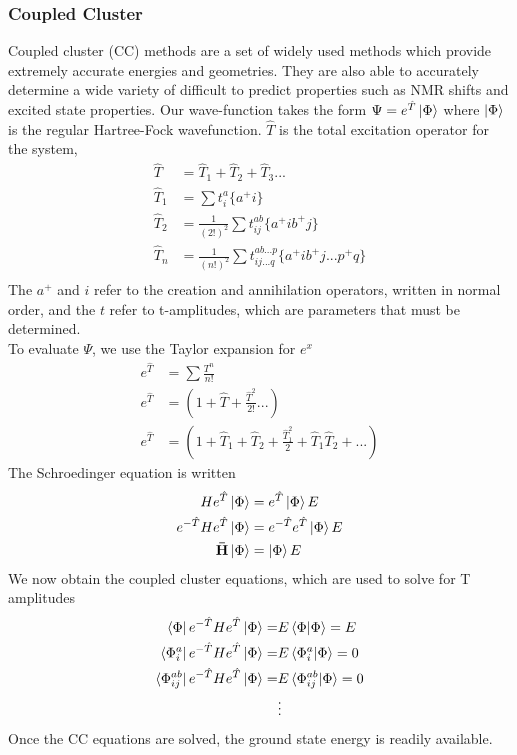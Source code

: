 \documentclass[letterpaper, 12pt, titlepage]{article}
\begin{document}
\subsubsection{Coupled Cluster}
Coupled cluster (CC) methods are a set of widely used methods which provide extremely accurate energies and geometries. They are also able to accurately determine a wide variety of difficult to predict properties such as NMR shifts and excited state properties. Our wave-function takes the form $\Psi=e^{\hat{T}} \ket{\Phi}$ where $\ket{\Phi}$ is the regular Hartree-Fock wavefunction.  $\hat{T}$ is the total excitation operator for the system,
\begin{align*}
\hat{T} &= \hat{T}_1 + \hat{T}_2 + \hat{T}_3...\\
\hat{T}_1 &= \sum t_i^a \{a^+i\}\\
\hat{T}_2 &= \frac{1}{(2!)^2} \sum t_{ij}^{ab} \{a^+ib^+j\}\\
\hat{T}_n &= \frac{1}{(n!)^2} \sum t_{ij...q}^{ab...p}\{a^+ib^+j...p^{+}q\}\\
\end{align*} 
The $a^+$ and $i$ refer to the creation and annihilation operators,  written in normal order, and the $t$ refer to t-amplitudes, which are parameters that must be determined. \\
\medskip
To evaluate $\Psi$, we use the Taylor expansion for $e^x$
\begin{align*}
e^{\hat{T}}&=\sum \frac{T^n}{n!}\\
e^{\hat{T}}&=(1+\hat{T} + \frac{\hat{T}^2}{2!} ...)\\
e^{\hat{T}}&=(1+\hat{T}_1 + \hat{T}_2 + \frac{\hat{T}^2_1}{2} + \hat{T}_1 \hat{T}_2 +...)
\end{align*}
The Schroedinger equation is written 
\begin{align*}
He^{\hat{T}} \ket{\Phi} &=  e^{\hat{T}} \ket{\Phi} E \\
e^{-\hat{T}}He^{\hat{T}} \ket{\Phi} &=  e^{-\hat{T}}e^{\hat{T}} \ket{\Phi} E\\
\mathbf{\bar{H}} \ket{\Phi} &=  \ket{\Phi} E 
\end{align*}
We now obtain the coupled cluster equations, which are used to solve for T amplitudes
\begin{align*}
\bra{\Phi}e^{-\hat{T}}He^{\hat{T}}\ket{\Phi} =& E \braket{\Phi | \Phi} = E\\
\bra{\Phi_i^{a}}e^{-\hat{T}}He^{\hat{T}}\ket{\Phi} =& E\braket{\Phi_i^{a}|\Phi} = 0\\
\bra{\Phi_{ij}^{ab}}e^{-\hat{T}}He^{\hat{T}}\ket{\Phi} =& E \braket{\Phi_{ij}^{ab} | \Phi} = 0\\
&\vdots
\end{align*}
Once the CC equations are solved, the ground state energy is readily available.\\
\end{document}
